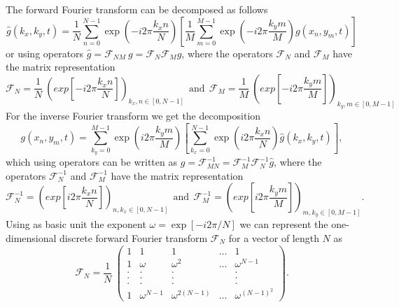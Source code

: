 The forward Fourier transform can be decomposed as follows
\begin{equation} \label{eq_forwardfourier_2D1D}
  \hat{g}(k_{x},k_{y},t) 
    = 
  \frac{1}{N} \sum_{n=0}^{N-1} 
     \exp 
      \left( 
        - i 2 \pi \frac{k_{x} n}{N}
      \right)
  \left[
   \frac{1}{M} \sum_{m=0}^{M-1} 
      \exp 
       \left( 
         - i 2 \pi \frac{k_{y} m}{M}
       \right)
   g(x_{n},y_{m},t) 
  \right]
\end{equation}
or using operators $\hat{g} = \mathcal{F}_{NM} \ g 
= \mathcal{F}_{N} \mathcal{F}_{M} g$, where the operators 
$\mathcal{F}_{N}$ and $\mathcal{F}_{M}$ have the matrix 
representation
\begin{equation} \label{eq_forwardfourier_1D}
  \mathcal{F}_{N} = 
   \frac{1}{N} \ 
   \left(
     exp \left[-i 2 \pi \frac{k_{x} n}{N} \right]
   \right)_{k_{x},n \in [0,N-1]}
   \ \ \mbox{and} \ \ 
  \mathcal{F}_{M} = 
   \frac{1}{M} \ 
   \left(
     exp \left[-i 2 \pi \frac{k_{y} m}{M} \right]
   \right)_{k_{y},m \in [0,M-1]}
\end{equation}
For the inverse Fourier transform we get the decomposition
\begin{equation} \label{eq_inversefourier_2D1D}
  g(x_{n},y_{m},t)
    = 
  \sum_{k_{y}=0}^{M-1}
     \exp
      \left( 
          i 2 \pi \frac{k_{y} m}{M}
      \right)
  \left[
   \sum_{k_{x}=0}^{N-1} 
      \exp 
       \left( 
          i 2 \pi \frac{k_{x} n}{N}
       \right)
   \hat{g}(k_{x},k_{y},t)
  \right],
\end{equation}
which using operators can be written as 
$g=\mathcal{F}^{-1}_{MN}=\mathcal{F}^{-1}_{M} \mathcal{F}^{-1}_{N} \hat{g}$, 
where the operators $\mathcal{F}^{-1}_{N}$ and $\mathcal{F}^{-1}_{M}$ 
have the matrix representation
\begin{equation} \label{eq_inversefourier_1D}
  \mathcal{F}^{-1}_{N} = 
   \left(
     exp \left[i 2 \pi \frac{k_{x} n}{N} \right]
   \right)_{n,k_{x} \in [0,N-1]}
   \ \ \mbox{and} \ \ 
  \mathcal{F}^{-1}_{M} = 
   \left(
     exp \left[i 2 \pi \frac{k_{y} m}{M} \right]
   \right)_{m,k_{y} \in [0,M-1]}.
\end{equation}
Using as basic unit the exponent $\omega = \exp \left[-i 2 \pi/N \right]$
we can represent the one-dimensional discrete forward Fourier transform
$\mathcal{F}_{N}$ for a vector of length $N$ as
\begin{equation} \label{eq_forwardfourier_1D_matrix}
 \mathcal{F}_{N}
  =
 \frac{1}{N} \ 
 \left(
  \begin{array}{ccccc}
    1 &    1         &     1           & \dots & 1
   \\
    1 & \omega       & \omega^{2}      & \dots & \omega^{N-1}
   \\
    . &    .         &     .           &       & . 
   \\
    . &    .         &     .           &       & .
   \\
    . &    .         &     .           &       & .
   \\
    1 & \omega^{N-1} & \omega^{2(N-1)} & \dots & \omega^{(N-1)^{2}}
  \end{array}
 \right). 
\end{equation}
